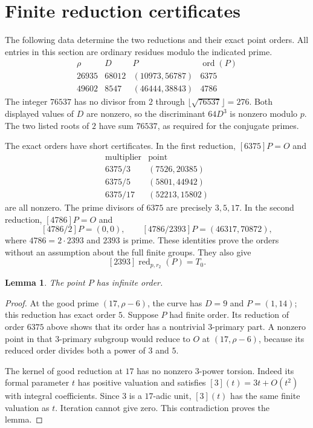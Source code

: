 \documentclass[11pt,a4paper]{article}
\newtheorem{lemma}[theorem]{Lemma}
\begin{document}
\section{Finite reduction certificates}
The following data determine the two reductions and their exact point
orders. All entries in this section are ordinary residues modulo the
indicated prime.
\[
\begin{array}{c|r|r|r}
 \rho&D&P&\operatorname{ord}(P)\\\hline
 26935&68012&(10973,56787)&6375\\
 49602&8547 &(46444,38843)&4786
\end{array}
\]
The integer $76537$ has no divisor from $2$ through
$\lfloor\sqrt{76537}\rfloor=276$. Both displayed values of $D$
are nonzero, so the discriminant $64D^3$ is nonzero modulo $p$.
The two listed roots of $2$ have sum $76537$, as required for the
conjugate primes.

The exact orders have short certificates. In the first reduction,
$[6375]P=O$ and
\[
\begin{array}{c|r}
 \text{multiplier}&\text{point}\\\hline
 6375/3 &(7526,20385)\\
 6375/5 &(5801,44942)\\
 6375/17&(52213,15802)
\end{array}
\]
are all nonzero. The prime divisors of $6375$ are precisely $3,5,17$.
In the second reduction, $[4786]P=O$ and
\[
 [4786/2]P=(0,0),\qquad
 [4786/2393]P=(46317,70872),
\]
where $4786=2\cdot2393$ and $2393$ is prime. These identities prove
the orders without an assumption about the full finite groups.
They also give
\begin{equation}\label{eq:half}
                   [2393]\operatorname{red}_{p,r_2}(P)=T_0.
\end{equation}

\begin{lemma}\label{lem:nontorsion}
The point $P$ has infinite order.
\end{lemma}
\begin{proof}
At the good prime $(17,\rho-6)$, the curve has $D=9$ and
$P=(1,14)$; this reduction has exact order $5$.
Suppose $P$ had finite order. Its reduction of order $6375$ above
shows that its order has a nontrivial $3$-primary part.
A nonzero point in that $3$-primary subgroup would reduce to $O$
at $(17,\rho-6)$, because its reduced order divides both a power
of $3$ and $5$.

The kernel of good reduction at $17$ has no nonzero $3$-power
torsion. Indeed its formal parameter $t$ has positive valuation and
satisfies $[3](t)=3t+O(t^2)$ with integral coefficients. Since $3$
is a $17$-adic unit, $[3](t)$ has the same finite valuation as $t$.
Iteration cannot give zero. This contradiction proves the lemma.
\end{proof}
\end{document}
